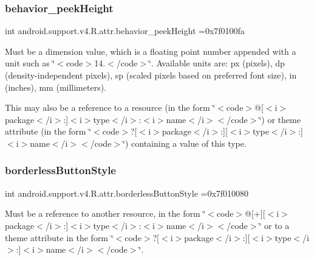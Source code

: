 \subsubsection{\texorpdfstring{behavior\+\_\+peek\+Height}{behavior\_peekHeight}}
{\footnotesize\ttfamily int android.\+support.\+v4.\+R.\+attr.\+behavior\+\_\+peek\+Height =0x7f0100fa\hspace{0.3cm}{\ttfamily [static]}}

Must be a dimension value, which is a floating point number appended with a unit such as \char`\"{}$<$code$>$14.\+5sp$<$/code$>$\char`\"{}. Available units are\+: px (pixels), dp (density-\/independent pixels), sp (scaled pixels based on preferred font size), in (inches), mm (millimeters). 

This may also be a reference to a resource (in the form \char`\"{}$<$code$>$@\mbox{[}$<$i$>$package$<$/i$>$\+:\mbox{]}$<$i$>$type$<$/i$>$\+:$<$i$>$name$<$/i$>$$<$/code$>$\char`\"{}) or theme attribute (in the form \char`\"{}$<$code$>$?\mbox{[}$<$i$>$package$<$/i$>$\+:\mbox{]}\mbox{[}$<$i$>$type$<$/i$>$\+:\mbox{]}$<$i$>$name$<$/i$>$$<$/code$>$\char`\"{}) containing a value of this type. \mbox{\label{classandroid_1_1support_1_1v4_1_1R_1_1attr_a08415738186ce4d57592c16d5f7c423f}} 
\subsubsection{\texorpdfstring{borderless\+Button\+Style}{borderlessButtonStyle}}
{\footnotesize\ttfamily int android.\+support.\+v4.\+R.\+attr.\+borderless\+Button\+Style =0x7f010080\hspace{0.3cm}{\ttfamily [static]}}

Must be a reference to another resource, in the form \char`\"{}$<$code$>$@\mbox{[}+\mbox{]}\mbox{[}$<$i$>$package$<$/i$>$\+:\mbox{]}$<$i$>$type$<$/i$>$\+:$<$i$>$name$<$/i$>$$<$/code$>$\char`\"{} or to a theme attribute in the form \char`\"{}$<$code$>$?\mbox{[}$<$i$>$package$<$/i$>$\+:\mbox{]}\mbox{[}$<$i$>$type$<$/i$>$\+:\mbox{]}$<$i$>$name$<$/i$>$$<$/code$>$\char`\"{}. \mbox{\label{classandroid_1_1support_1_1v4_1_1R_1_1attr_a05efc50b5af682c842a413b753b38a20}} 
